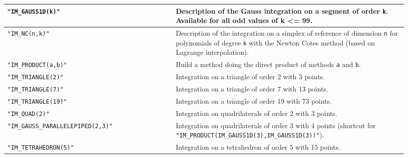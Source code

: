 \begin{center} \begin{tabular}{|m{0.4\linewidth}|m{0.55\linewidth}|} \hline
{\tt "IM\_GAUSS1D(k)" } & Description of the Gauss integration on a segment of order {\tt k}. Available for all odd values of k <= 99.\\ \hline
{\tt "IM\_NC(n,k)"} & Description of the integration on a simplex of reference of dimension {\tt n} for polynomials of degree {\tt k} with the Newton Cotes method (based on Lagrange interpolation).\\ \hline
{\tt "IM\_PRODUCT(a,b)"} & Build a method doing the direct product of methods {\tt a} and {\tt b}. \\ \hline
{\tt "IM\_TRIANGLE(2)"} & Integration on a triangle of order 2 with 3 points. \\ \hline
{\tt "IM\_TRIANGLE(7)"} & Integration on a triangle of order 7 with 13 points. \\ \hline
{\tt "IM\_TRIANGLE(19)"} & Integration on a triangle of order 19 with 73 points. \\ \hline
{\tt "IM\_QUAD(2)"} & Integration on quadrilaterals of order 2 with 3 points. \\ \hline
{\tt "IM\_GAUSS\_PARALLELEPIPED(2,3)"} & Integration on quadrilaterals of order 3 with 4 points (shortcut for {\tt "IM\_PRODUCT(IM\_GAUSS1D(3),IM\_GAUSS1D(3))"}). \\ \hline
{\tt "IM\_TETRAHEDRON(5)"} & Integration on a tetrahedron of order 5 with 15 points. \\ \hline
\end{tabular} \end{center}
